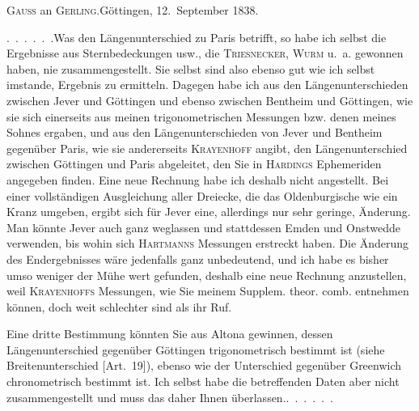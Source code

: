 \begin{center}
\textsc{Gauss} an \textsc{Gerling}.\quad Göttingen, 12.~September 1838.
\end{center}
\par\noindent\hspace*{\parindent}\mbox{.\ .\ .\ .\ .\ .}\quad Was den Längenunterschied zu Paris betrifft, so habe ich selbst die Ergebnisse aus Sternbedeckungen usw., die \textsc{Triesnecker}, \textsc{Wurm} u.~a. gewonnen haben, nie zusammengestellt. Sie selbst sind also ebenso gut wie ich selbst imstande,  Ergebnis zu ermitteln. Dagegen habe ich aus den Längenunterschieden zwischen Jever und Göttingen und ebenso zwischen Bentheim und Göttingen, wie sie sich einerseits aus meinen trigonometrischen Messungen bzw. denen meines Sohnes ergaben, und aus den Längenunterschieden von Jever und Bentheim gegenüber Paris, wie sie andererseits \textsc{Krayenhoff} angibt, den Längenunterschied zwischen Göttingen und Paris abgeleitet, den Sie in \textsc{Hardings} Ephemeriden angegeben finden. Eine neue Rechnung habe ich deshalb nicht angestellt. Bei einer vollständigen Ausgleichung aller Dreiecke, die das Oldenburgische wie ein Kranz umgeben, ergibt sich für Jever eine, allerdings nur sehr geringe, Änderung. Man könnte Jever auch ganz weglassen und stattdessen Emden und Onstwedde verwenden, bis wohin sich \textsc{Hartmanns} Messungen erstreckt haben. Die Änderung des Endergebnisses wäre jedenfalls ganz unbedeutend, und ich habe es bisher umso weniger der Mühe wert gefunden, deshalb eine neue Rechnung anzustellen, weil \textsc{Krayenhoffs} Messungen, wie Sie meinem Supplem. theor. comb. entnehmen können, doch weit schlechter sind als ihr Ruf.
\par\noindent\hspace*{\parindent}Eine dritte Bestimmung könnten Sie aus Altona gewinnen, dessen Längenunterschied gegenüber Göttingen trigonometrisch bestimmt ist (siehe Breitenunterschied [Art.~19]), ebenso wie der Unterschied gegenüber Greenwich chronometrisch bestimmt ist. Ich selbst habe die betreffenden Daten aber nicht zusammengestellt und muss das daher Ihnen überlassen.\quad\mbox{.\ .\ .\ .\ .\ .}

